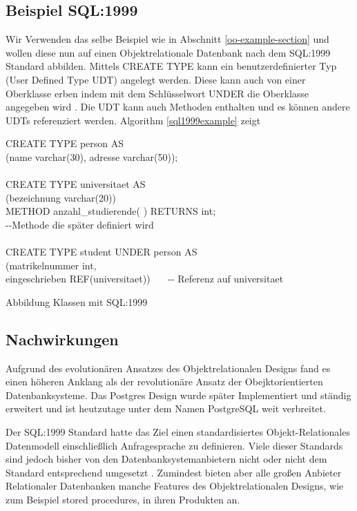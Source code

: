 \subsection{Beispiel SQL:1999}
Wir Verwenden das selbe Beispiel wie in Abschnitt \ref{oo-example-section} und wollen diese nun auf einen Objektrelationale Datenbank nach dem SQL:1999 Standard abbilden.  Mittels CREATE TYPE kann ein benutzerdefinierter Typ (User Defined Type UDT) angelegt werden. Diese kann auch von einer Oberklasse erben indem mit dem Schlüsselwort UNDER die Oberklasse angegeben wird \cite{gulutzan1999}. Die UDT kann auch Methoden enthalten und es können andere UDTs referenziert werden. Algorithm \ref{sql1999example} zeigt 

\vspace{.3cm}
\begin{algorithm}[H]
	CREATE TYPE person AS \\
	\Indp
		(name varchar(30), adresse varchar(50)); \\
	\Indm 
	~ \\
	CREATE TYPE universitaet AS \\
	\Indp
		(bezeichnung varchar(20)) \\
		METHOD anzahl\_studierende( ) RETURNS int;   \\ \Indp -{}-Methode die später definiert wird \\ \Indm
	\Indm
	~ \\
	CREATE TYPE student UNDER person AS \\
	\Indp
		(matrikelnummer int, \\
		eingeschrieben REF(universitaet)) ~~~-{}- Referenz auf universitaet \\
	\Indm
	\caption{Abbildung Klassen mit SQL:1999}
	\label{sql1999example}
\end{algorithm}
\vspace{.3cm}

\subsection{Nachwirkungen}
Aufgrund des evolutionären Ansatzes des Objektrelationalen Designs fand es einen höheren Anklang als der revolutionäre Ansatz der Obejktorientierten Datenbanksysteme. Das Postgres Design wurde später Implementiert und ständig erweitert und ist heutzutage unter dem Namen PostgreSQL weit verbreitet. 

Der SQL:1999 Standard hatte das Ziel einen standardisiertes Objekt-Relationales Datenmodell einschließlich Anfragesprache zu definieren. Viele dieser Standards sind jedoch bisher von den Datenbanksystemanbietern nicht oder nicht dem Standard entsprechend umgesetzt \cite{kemper2013}. Zumindest bieten aber alle großen Anbieter Relationaler Datenbanken manche Features des Objektrelationalen Designs, wie zum Beispiel stored procedures, in ihren Produkten an.


%
